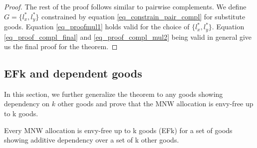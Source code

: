 \begin{proof}
The rest of the proof follows similar to pairwise complements. We define $G = \{l_x^*, l_y^*\}$ constrained by equation \ref{eq_constrain_pair_compl} for substitute goods. Equation \ref{eq_proofmul1} holds valid for the choice of $\{l_x^*, l_y^*\}$. Equation \ref{eq_proof_compl_final} and \ref{eq_proof_compl_mul2} being valid in general give us the final proof for the theorem.
\end{proof}



\subsection{EFk and dependent goods}
\label{subsection_EFk_dep}

In this section, we further generalize the theorem to any goods showing dependency on $k$ other goods and prove that the MNW allocation is envy-free up to k goods.

\begin{theorem}
Every MNW allocation is envy-free up to k goods (EFk) for a set of goods showing additive dependency over a set of k other goods.
\end{theorem}


